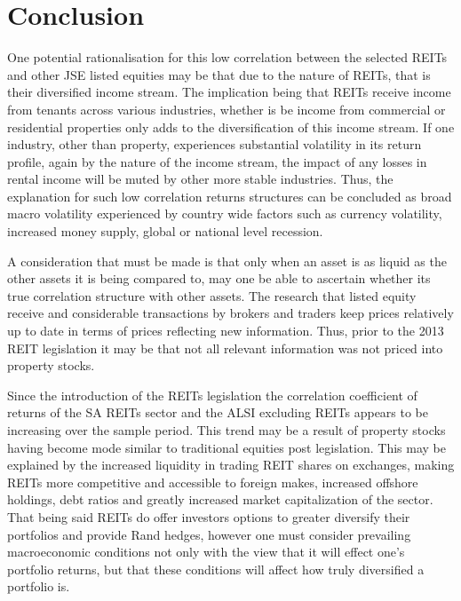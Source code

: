 \documentclass[11pt,preprint, authoryear]{elsarticle}
\numberwithin{equation}{section}
\numberwithin{figure}{section}
\numberwithin{table}{section}
\begin{document}
\hypertarget{conclusion}{%
\section{\texorpdfstring{Conclusion
\label{Conclusion}}{Conclusion }}\label{conclusion}}

One potential rationalisation for this low correlation between the
selected REITs and other JSE listed equities may be that due to the
nature of REITs, that is their diversified income stream. The
implication being that REITs receive income from tenants across various
industries, whether is be income from commercial or residential
properties only adds to the diversification of this income stream. If
one industry, other than property, experiences substantial volatility in
its return profile, again by the nature of the income stream, the impact
of any losses in rental income will be muted by other more stable
industries. Thus, the explanation for such low correlation returns
structures can be concluded as broad macro volatility experienced by
country wide factors such as currency volatility, increased money
supply, global or national level recession.

A consideration that must be made is that only when an asset is as
liquid as the other assets it is being compared to, may one be able to
ascertain whether its true correlation structure with other assets. The
research that listed equity receive and considerable transactions by
brokers and traders keep prices relatively up to date in terms of prices
reflecting new information. Thus, prior to the 2013 REIT legislation it
may be that not all relevant information was not priced into property
stocks.

Since the introduction of the REITs legislation the correlation
coefficient of returns of the SA REITs sector and the ALSI excluding
REITs appears to be increasing over the sample period. This trend may be
a result of property stocks having become mode similar to traditional
equities post legislation. This may be explained by the increased
liquidity in trading REIT shares on exchanges, making REITs more
competitive and accessible to foreign makes, increased offshore
holdings, debt ratios and greatly increased market capitalization of the
sector. That being said REITs do offer investors options to greater
diversify their portfolios and provide Rand hedges, however one must
consider prevailing macroeconomic conditions not only with the view that
it will effect one's portfolio returns, but that these conditions will
affect how truly diversified a portfolio is.
\end{document}
